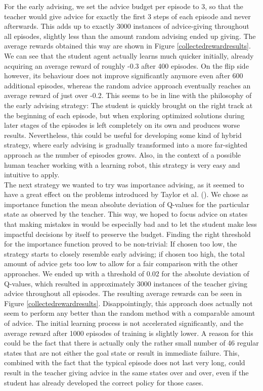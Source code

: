 \documentclass[12pt,twoside]{article}
\theoremstyle{plain}
\theoremstyle{definition}
\theoremstyle{remark}
\begin{document}
For the early advising, we set the advice budget per episode to 3, so that the teacher would give advice for exactly the first 3 steps of each episode and never afterwards. This adds up to exactly 3000 instances of advice-giving throughout all episodes, slightly less than the amount random advising ended up giving. The average rewards obtained this way are shown in Figure \ref{collectedrewardresults}. We can see that the student agent actually learns much quicker initially, already acquiring an average reward of roughly -0.3 after 400 episodes. On the flip side however, its behaviour does not improve significantly anymore even after 600 additional episodes, whereas the random advice approach eventually reaches an average reward of just over -0.2. This seems to be in line with the philosophy of the early advising strategy: The student is quickly brought on the right track at the beginning of each episode, but when exploring optimized solutions during later stages of the episodes is left completely on its own and produces worse results. Nevertheless, this could be useful for developing some kind of hybrid strategy, where early advising is gradually transformed into a more far-sighted approach as the number of episodes grows. Also, in the context of a possible human teacher working with a learning robot, this strategy is very easy and intuitive to apply.
\\
The next strategy we wanted to try was importance advising, as it seemed to have a great effect on the problems introduced by Taylor et al. (\cite{Taylor2014reinforcement}). We chose as importance function the mean absolute deviation of Q-values for the particular state as observed by the teacher. This way, we hoped to focus advice on states that making mistakes in would be especially bad and to let the student make less impactful decisions by itself to preserve the budget. Finding the right threshold for the importance function proved to be non-trivial: If chosen too low, the strategy starts to closely resemble early advising; if chosen too high, the total amount of advice gets too low to allow for a fair comparison with the other approaches. We ended up with a threshold of 0.02 for the absolute deviation of Q-values, which resulted in approximately 3000 instances of the teacher giving advice throughout all episodes. The resulting average rewards can be seen in Figure \ref{collectedrewardresults}. Disappointingly, this approach does actually not seem to perform any better than the random method with a comparable amount of advice. The initial learning process is not accelerated significantly, and the average reward after 1000 episodes of training is slightly lower. A reason for this could be the fact that there is actually only the rather small number of 46 regular states that are not either the goal state or result in immediate failure. This, combined with the fact that the typical episode does not last very long, could result in the teacher giving advice in the same states over and over, even if the student has already developed the correct policy for those cases.
\end{document}
